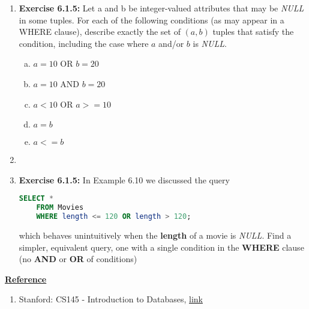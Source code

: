 \documentclass[12pt]{article}
\begin{document}
\begin{enumerate}[1.]
    \item \textbf{Exercise 6.1.5:} Let a and b be integer-valued attributes that
    may be \textit{NULL} in some tuples. For each of the following conditions
    (as may appear in a WHERE clause), describe exactly the set of $(a, b)$ tuples
    that satisfy the condition, including the case where $a$ and/or $b$ is \textit{NULL}.

    \bigskip

    \begin{enumerate}[a)]
        \item $a = 10$ OR $b = 20$
        \item $a = 10$ AND $b = 20$
        \item $a < 10$ OR $a >= 10$
        \item $a = b$
        \item $a <= b$
    \end{enumerate}

    \item

    \item \textbf{Exercise 6.1.5:} In Example 6.10 we discussed the query

    \begin{lstlisting}[language=SQL]
    SELECT *
    FROM Movies
    WHERE length <= 120 OR length > 120;
    \end{lstlisting}

    \bigskip

    which behaves unintuitively when the \textbf{length} of a movie is \textit{NULL}.
    Find a simpler, equivalent query, one with a single condition in the \textbf{WHERE} clause
    (no \textbf{AND} or \textbf{OR} of conditions)

\end{enumerate}

\bigskip

\underline{\textbf{Reference}}

\bigskip

\begin{enumerate}[1)]
    \item Stanford: CS145 - Introduction to Databases, \href{http://infolab.stanford.edu/~ullman/fcdb/aut07/index.html}{link}
\end{enumerate}
\end{document}
